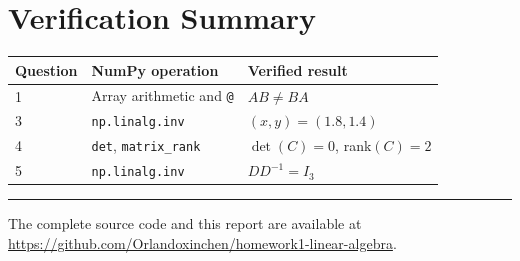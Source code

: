 \documentclass[11pt]{article}
\begin{document}
\section*{Verification Summary}
\begin{center}
\begin{tabular}{@{}lll@{}}
\toprule
Question & NumPy operation & Verified result \\
\midrule
1 & Array arithmetic and \texttt{@} & $AB\ne BA$ \\
3 & \texttt{np.linalg.inv} & $(x,y)=(1.8,1.4)$ \\
4 & \texttt{det}, \texttt{matrix\_rank} & $\det(C)=0$, rank$(C)=2$ \\
5 & \texttt{np.linalg.inv} & $DD^{-1}=I_3$ \\
\bottomrule
\end{tabular}
\end{center}

\vfill
\noindent\rule{\textwidth}{0.4pt}
\small\noindent The complete source code and this report are available at
\href{https://github.com/Orlandoxinchen/homework1-linear-algebra}
{https://github.com/Orlandoxinchen/homework1-linear-algebra}.
\end{document}
